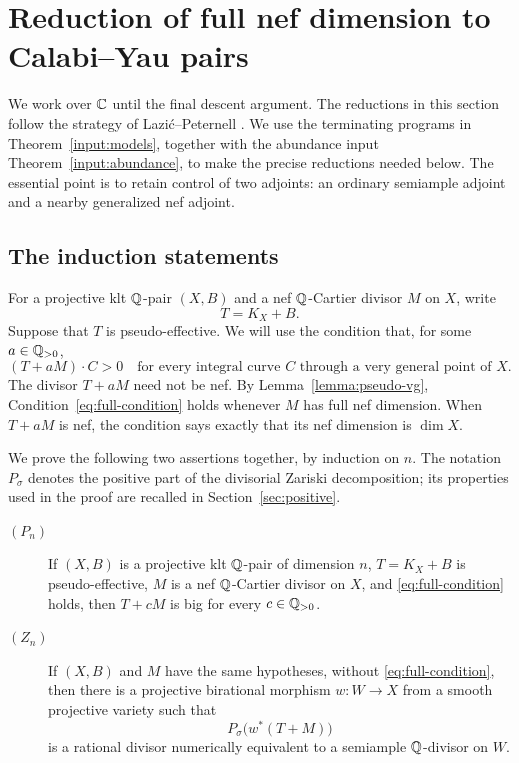 \section{Reduction of full nef dimension to Calabi--Yau pairs}
\label{sec:reduction}

We work over $\mathbb C$ until the final descent argument.  The reductions in
this section follow the strategy of Lazi\'c--Peternell
\cite[Sections 4 and 5]{LP}.  We use the terminating programs in
Theorem~\ref{input:models}, together with the abundance input
Theorem~\ref{input:abundance}, to make the precise reductions needed below.
The essential point is to retain control of two adjoints: an ordinary
semiample adjoint and a nearby generalized nef adjoint.

\subsection{The induction statements}

For a projective klt $\mathbb Q$-pair $(X,B)$ and a nef $\mathbb Q$-Cartier divisor $M$
on $X$, write
\[
                         T=K_X+B.
\]
Suppose that $T$ is pseudo-effective.  We will use the condition that,
for some $a\in\mathbb Q_{>0}$,
\begin{equation}\label{eq:full-condition}
 (T+aM)\cdot C>0
 \quad\text{for every integral curve $C$ through a very general point of $X$.}
\end{equation}
The divisor $T+aM$ need not be nef.  By
Lemma~\ref{lemma:pseudo-vg}, Condition~\eqref{eq:full-condition} holds
whenever $M$ has full nef dimension.  When $T+aM$ is nef, the condition
says exactly that its nef dimension is $\dim X$.

We prove the following two assertions together, by induction on $n$.
The notation $P_\sigma$ denotes the positive part of the divisorial
Zariski decomposition; its properties used in the proof are recalled
in Section~\ref{sec:positive}.
\begin{description}
\item[$(P_n)$] If $(X,B)$ is a projective klt $\mathbb Q$-pair of dimension $n$,
$T=K_X+B$ is pseudo-effective, $M$ is a nef $\mathbb Q$-Cartier divisor on $X$,
and \eqref{eq:full-condition} holds, then $T+cM$ is big for every
$c\in\mathbb Q_{>0}$.
\item[$(Z_n)$] If $(X,B)$ and $M$ have the same hypotheses, without
\eqref{eq:full-condition}, then there is a projective birational morphism
$w\colon W\to X$ from a smooth projective variety such that
\[
                         P_\sigma\bigl(w^*(T+M)\bigr)
\]
is a rational divisor numerically equivalent to a semiample
$\mathbb Q$-divisor on $W$.
\end{description}

